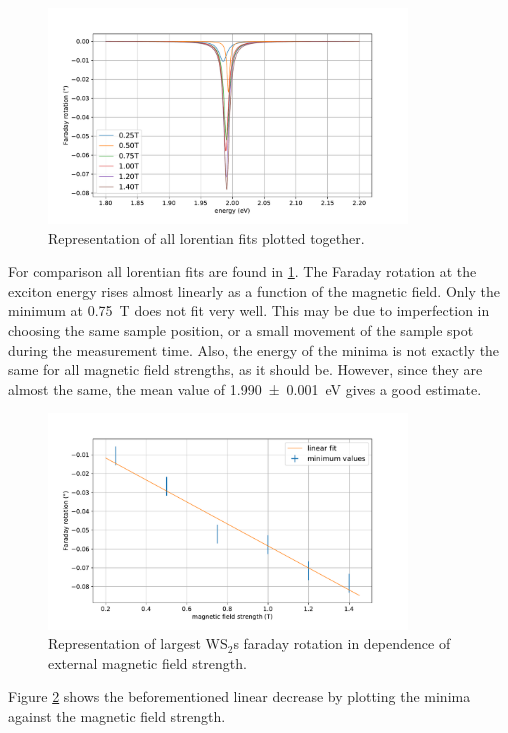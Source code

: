 \begin{figure}[!ht]
    \centering
    \includegraphics[width=0.85\textwidth]{plots/WS2_lorentians.pdf}
    \caption{Representation of all lorentian fits plotted together.}
    \label{fig_WS2_lorentians}
\end{figure}
For comparison all lorentian fits are found in \cref{fig_WS2_lorentians}.
The Faraday rotation at the exciton energy rises almost linearly as a function of the magnetic field.
Only the minimum at \SI{0.75}{\tesla} does not fit very well.
This may be due to imperfection in choosing the same sample position, or a small movement of the sample spot during the measurement time.
Also, the energy of the minima is not exactly the same for all magnetic field strengths, as it should be.
However, since they are almost the same, the mean value of \SI{1.990+-0.001}{\electronvolt} gives a good estimate.

\begin{figure}[!ht]
    \centering
    \includegraphics[width=0.85\textwidth]{plots/WS2_mins.pdf}
    \caption{Representation of largest WS$_2$s faraday rotation in dependence of external magnetic field strength.}
    \label{fig_WS2_minima}
\end{figure}
Figure \ref{fig_WS2_minima} shows the beforementioned linear decrease by plotting the minima against the magnetic field strength.

